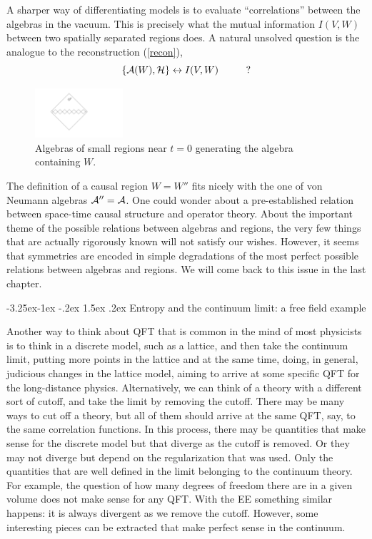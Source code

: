 \documentclass[11pt,a4paper]{article}
\makeatletter
\renewcommand\subsection{\@startsection{subsection}{2}{\z@}%
                                   {-3.25ex\@plus -1ex \@minus -.2ex}%
                                     {1.5ex \@plus .2ex}%
                                     {\normalfont\bfseries}}
\numberwithin{equation}{section}
\newcommand{\be}{\begin{equation}}
\newcommand{\ee}{\end{equation}}
\makeatother
\begin{document}
A sharper way of differentiating models is to evaluate ``correlations'' between the algebras in the vacuum. This is precisely what the mutual information $I(V,W)$ between two spatially separated regions does. A natural unsolved question is the analogue to the reconstruction (\ref{recon}),
\be
\{{\cal A}(W), {\cal H}\}\leftrightarrow I(V,W) \hspace{1cm}?  
\ee

\begin{figure}[t]
\begin{center}  
\includegraphics[width=0.29\textwidth]{causal1.pdf}
\captionsetup{width=0.9\textwidth}
\caption{Algebras of small regions near $t=0$ generating the algebra containing $W$.}
\label{causal1}
\end{center}  
\end{figure}

The definition of a causal region $W=W''$ fits nicely with the one of von Neumann algebras ${\cal A}''={\cal A}$.  One could wonder about a pre-established relation between space-time causal structure and operator theory. About the important theme of the possible relations between algebras and regions, the very few things that are actually rigorously known will not satisfy our wishes. However, it seems that symmetries are encoded in simple degradations of the most perfect possible relations between algebras and regions. We will come back to this issue in the last chapter.    

\subsection{Entropy and the continuum limit: a free field example}

Another way to think about QFT that is common in the mind of most physicists is to think in a discrete model, such as a lattice, and then take the continuum limit, putting more points in the lattice and at the same time, doing, in general, judicious changes in the lattice model,  aiming to arrive at some specific QFT for the long-distance physics. Alternatively, we can think of a theory with a different sort of cutoff, and take the limit by removing the cutoff. There may be many ways to cut off a theory, but all of them should arrive at the same QFT, say, to the same correlation functions. In this process, there may be quantities that make sense for the discrete model but that diverge as the cutoff is removed. Or they may not diverge but depend on the regularization that was used. Only the quantities that are well defined in the limit belonging to the continuum theory. For example, the question of how many degrees of freedom there are in a given volume does not make sense for any QFT. With the EE something similar happens: it is always divergent as we remove the cutoff. However, some interesting pieces can be extracted that make perfect sense in the continuum.    
\end{document}
